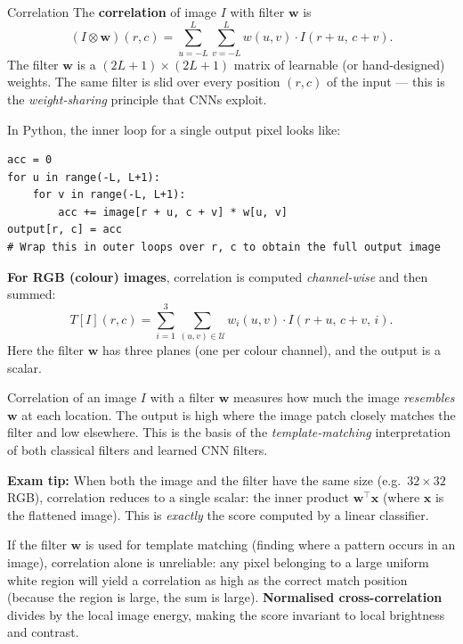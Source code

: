 \documentclass[11pt,a4paper]{article}
\begin{document}
\begin{defbox}{Correlation}
The \textbf{correlation} of image $I$ with filter $\mathbf{w}$ is
\[
  (I \otimes \mathbf{w})(r, c)
  = \sum_{u=-L}^{L} \sum_{v=-L}^{L} w(u, v)\cdot I(r + u,\, c + v).
\]
The filter $\mathbf{w}$ is a $(2L+1)\times(2L+1)$ matrix of learnable (or hand-designed) weights.
The same filter is slid over every position $(r, c)$ of the input — this is the \emph{weight-sharing}
principle that CNNs exploit.
\end{defbox}

In Python, the inner loop for a single output pixel looks like:
\begin{lstlisting}
acc = 0
for u in range(-L, L+1):
    for v in range(-L, L+1):
        acc += image[r + u, c + v] * w[u, v]
output[r, c] = acc
# Wrap this in outer loops over r, c to obtain the full output image
\end{lstlisting}

\textbf{For RGB (colour) images}, correlation is computed \emph{channel-wise} and then summed:
\[
  T[I](r, c)
  = \sum_{i=1}^{3} \sum_{(u,v) \in \mathcal{U}} w_i(u, v)\cdot I(r + u,\, c + v,\, i).
\]
Here the filter $\mathbf{w}$ has three planes (one per colour channel), and the output is a scalar.

\begin{insightbox}
Correlation of an image $I$ with a filter $\mathbf{w}$ measures how much the image
\emph{resembles} $\mathbf{w}$ at each location.  The output is high where the image patch
closely matches the filter and low elsewhere.  This is the basis of the \emph{template-matching}
interpretation of both classical filters and learned CNN filters.

\textbf{Exam tip:} When both the image and the filter have the same size (e.g.\ $32\times32$ RGB),
correlation reduces to a single scalar: the inner product $\mathbf{w}^{\top}\mathbf{x}$ (where
$\mathbf{x}$ is the flattened image).  This is \emph{exactly} the score computed by a linear classifier.
\end{insightbox}

\begin{warnbox}
If the filter $\mathbf{w}$ is used for template matching (finding where a pattern occurs in an image),
correlation alone is unreliable: any pixel belonging to a large uniform white region will yield a
correlation as high as the correct match position (because the region is large, the sum is large).
\textbf{Normalised cross-correlation} divides by the local image energy, making the score invariant
to local brightness and contrast.
\end{warnbox}
\end{document}
